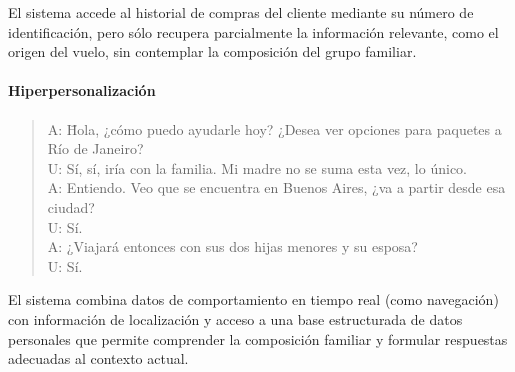 El sistema accede al historial de compras del cliente mediante su número de identificación, pero sólo recupera parcialmente la información relevante, como el origen del vuelo, sin contemplar la composición del grupo familiar.

\paragraph{Hiperpersonalización}
\begin{quote}
	\begin{tabbing}
		A: \= Hola, ¿cómo puedo ayudarle hoy? ¿Desea ver opciones para paquetes a Río de Janeiro? \\
		U: \> Sí, sí, iría con la familia. Mi madre no se suma esta vez, lo único. \\
		A: \> Entiendo. Veo que se encuentra en Buenos Aires, ¿va a partir desde esa ciudad? \\
		U: \> Sí. \\
		A: \> ¿Viajará entonces con sus dos hijas menores y su esposa? \\
		U: \> Sí.
	\end{tabbing}
\end{quote}

El sistema combina datos de comportamiento en tiempo real (como navegación) con información de localización y acceso a una base estructurada de datos personales que permite comprender la composición familiar y formular respuestas adecuadas al contexto actual.

